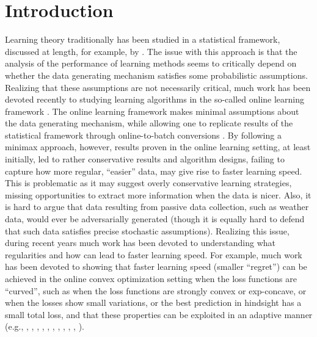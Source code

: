 \documentclass[english]{article}
\begin{document}
\section{Introduction}
Learning theory traditionally has been studied in a statistical framework, discussed at length, for example, by \citet{SSS14:book}.
The issue with this approach is that the analysis of the performance of learning methods seems to critically depend
on whether the data generating mechanism satisfies some probabilistic assumptions. 
Realizing that these assumptions are not necessarily critical, much work has been devoted recently to 
studying learning algorithms in the so-called online learning framework \citep{CBLu06:book}. %
The online learning framework makes minimal assumptions about the data generating mechanism,
while allowing one to replicate results of the statistical framework through online-to-batch conversions
\citep{CBCoG04:OnlineToBatch}.
By following a minimax approach, however, results proven in the online learning setting, at least initially, led to rather
conservative results and algorithm designs, failing to capture how more regular, ``easier'' data, may give rise to
faster learning speed. This is problematic as it may suggest overly conservative learning strategies, missing
opportunities to extract more information when the data is nicer. Also, it is hard to argue that data resulting from
passive data collection, such as weather data, would ever be adversarially generated (though it is equally hard
to defend that such data satisfies precise stochastic assumptions).
Realizing this issue, during recent years much work has been devoted to understanding what regularities and how can lead to 
faster learning speed.
For example, much work has been devoted to showing that faster learning speed (smaller ``regret'') can be achieved
in the online convex optimization setting when the loss functions are ``curved'', such 
as when the loss functions are strongly convex or exp-concave, %
or when the losses show small variations, or the best prediction in hindsight has a small total loss, and that these properties can be exploited in an adaptive manner  (e.g.,
\citealt{MF92}, \citealt{FrSc97},
\citealt{gaivoronski2000stochastic},
\citealt{CBLu06:book},
\citealt{hazan2007logarithmic},
\citealt{bartlett2007adaptive},
\citealt{kakade2009mind},
\citealt{orabona2012beyond},
\citealt{RakhlinS13},
\citealt{vanerven2015fast},
\citealt{foster2015adaptive}).
\end{document}
